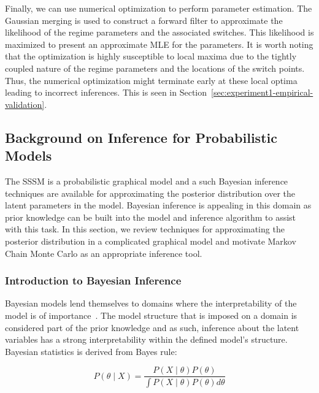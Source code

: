 Finally, we can use numerical optimization to perform parameter estimation. The Gaussian merging is used to construct a forward filter to approximate the likelihood of the regime parameters and the associated switches. This likelihood is maximized to present an approximate MLE for the parameters. It is worth noting that the optimization is highly susceptible to local maxima due to the tightly coupled nature of the regime parameters and the locations of the switch points. Thus, the numerical optimization might terminate early at these local optima leading to incorrect inferences. This is seen in Section~\ref{sec:experiment1-empirical-validation}.

\subsection{Background on Inference for Probabilistic Models}
The SSSM is a probabilistic graphical model and a such Bayesian inference techniques are available for approximating the posterior distribution over the latent parameters in the model. Bayesian inference is appealing in this domain as prior knowledge can be built into the model and inference algorithm to assist with this task. In this section, we review techniques for approximating the posterior distribution in a complicated graphical model and motivate Markov Chain Monte Carlo as an appropriate inference tool.

\subsubsection{Introduction to Bayesian Inference}

Bayesian models lend themselves to domains where the interpretability of the model is of importance~\citep{gelman2014bayesian}. The model structure that is imposed on a domain is considered part of the prior knowledge and as such, inference about the latent variables has a strong interpretability within the defined model's structure. Bayesian statistics is derived from Bayes rule:

\begin{equation}\label{eq:bayes_rule}
	P(\theta \mid X) = \frac{P(X \mid \theta)P(\theta)}{\int P(X \mid \theta)P(\theta) d\theta}
\end{equation}

